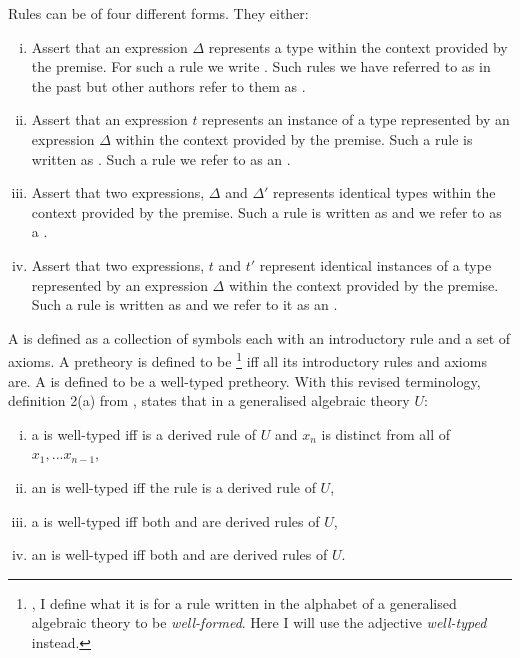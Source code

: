 Rules can be of four different forms. They either:

\begin{enumerate}[(i)]
\item Assert that an expression $\Delta$ represents a type within the context provided by the premise. For such a rule we write
. Such rules we have referred to as  \Trules in the past but other authors refer to them as .

\item Assert that an expression $t$ represents an instance of a type represented by an expression $\Delta$ within the context provided by the premise. Such a rule is written as
. Such a rule we refer to as an \trule.

\item Assert that two expressions, $\Delta$ and $\Delta'$ represents identical types within the context provided by the premise. Such a rule is written as 
 and we refer to as a \Teqrule.

\item Assert that two expressions, $t$ and $t'$ represent identical instances of a type represented by an expression $\Delta$  within the context provided by the premise. Such a rule is written as 
 and we  refer to it as an \teqrule.
\end{enumerate}


A  is defined as a collection of symbols each with an introductory rule and a set of axioms. A pretheory is defined to be \footnote{\cite{Cartmell86}, I define what it is for a rule written in the alphabet of a generalised algebraic theory to be \textit{well-formed}. Here I will use the adjective \textit{well-typed} instead.} iff all its introductory rules and axioms are. A  is defined to be a well-typed pretheory. 
With this revised terminology, definition 2(a) from \cite{Cartmell86}, states that in  a generalised algebraic theory $U$:
\begin{enumerate} [(i)]
\item 
a \Trule {} is well-typed  iff 
 is a derived rule of $U$ and $x_n$ is distinct from all of $x_1,...x_{n-1}$, 
\item 
an \trule {} is well-typed iff
the rule  is a derived rule of $U$,
\item 
a \Teqrule {} is well-typed iff
both  and  are derived rules
of $U$,
\item 
an \teqrule {} is well-typed iff
both  and  are derived rules
of $U$.
\end{enumerate}



